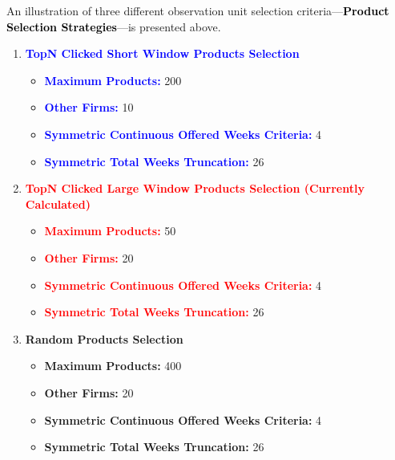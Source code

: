 \documentclass{article}
\begin{document}
\begin{center}

\end{center}\noindent
An illustration of three different observation unit selection criteria—\textbf{\textcolor{black}{Product Selection Strategies}}—is presented above.

\begin{enumerate}
    \item \textbf{\textcolor{blue}{TopN Clicked Short Window Products Selection}}
    \begin{itemize}
        \item \textbf{\textcolor{blue}{Maximum Products:}} 200
        \item \textbf{\textcolor{blue}{Other Firms:}} 10
        \item \textbf{\textcolor{blue}{Symmetric Continuous Offered Weeks Criteria:}} 4
        \item \textbf{\textcolor{blue}{Symmetric Total Weeks Truncation:}} 26
    \end{itemize}
    \item \textbf{\textcolor{red}{TopN Clicked Large Window Products Selection (Currently Calculated)}}
    \begin{itemize}
        \item \textbf{\textcolor{red}{Maximum Products:}} 50
        \item \textbf{\textcolor{red}{Other Firms:}} 20
        \item \textbf{\textcolor{red}{Symmetric Continuous Offered Weeks Criteria:}} 4
        \item \textbf{\textcolor{red}{Symmetric Total Weeks Truncation:}} 26
    \end{itemize}
    \item \textbf{\textcolor{green!70!black}{Random Products Selection}}
    \begin{itemize}
        \item \textbf{\textcolor{green!70!black}{Maximum Products:}} 400
        \item \textbf{\textcolor{green!70!black}{Other Firms:}} 20
        \item \textbf{\textcolor{green!70!black}{Symmetric Continuous Offered Weeks Criteria:}} 4
        \item \textbf{\textcolor{green!70!black}{Symmetric Total Weeks Truncation:}} 26
    \end{itemize}
\end{enumerate}
\end{document}

